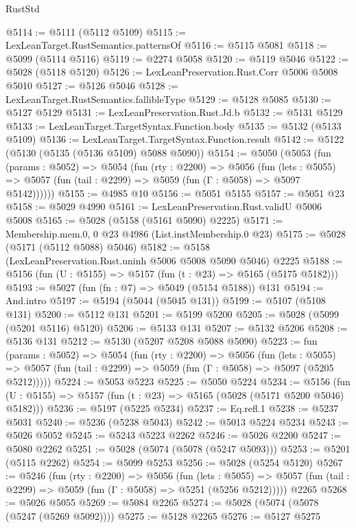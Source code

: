 \begin{lexlean}{RustStd}
\begin{coremodule}
@5114 := @5111 (@5112 @5109)
@5115 := LexLeanTarget.RustSemantics.patternsOf
@5116 := @5115 @5081
@5118 := @5099 (@5114 @5116)
@5119 := @2274 @5058
@5120 := @5119 @5046
@5122 := @5028 (@5118 @5120)
@5126 := LexLeanPreservation.Rust.Corr @5006 @5008 @5010
@5127 := @5126 @5046
@5128 := LexLeanTarget.RustSemantics.fallibleType
@5129 := @5128 @5085
@5130 := @5127 @5129
@5131 := LexLeanPreservation.Rust.Jd.b
@5132 := @5131 @5129
@5133 := LexLeanTarget.TargetSyntax.Function.body
@5135 := @5132 (@5133 @5109)
@5136 := LexLeanTarget.TargetSyntax.Function.result
@5142 := @5122 (@5130 (@5135 (@5136 @5109) @5088 @5090))
@5154 := @5050
    (@5053
      (fun (params : @5052) =>
      @5054
        (fun (rty : @2200) =>
        @5056
          (fun (lets : @5055) =>
          @5057 (fun (tail : @2299) => @5059 (fun (Γ : @5058) => @5097 @5142))))))
@5155 := @4985 @10
@5156 := @5051 @5155
@5157 := @5051 @23
@5158 := @5029 @4990
@5161 := LexLeanPreservation.Rust.validU @5006 @5008
@5165 := @5028 (@5158 (@5161 @5090) @2225)
@5171 := Membership.mem.{0, 0} @23 @4986 (List.instMembership.{0} @23)
@5175 := @5028 (@5171 (@5112 @5088) @5046)
@5182 := @5158 (LexLeanPreservation.Rust.uninh @5006 @5008 @5090 @5046) @2225
@5188 := @5156 (fun (U : @5155) => @5157 (fun (t : @23) => @5165 (@5175 @5182)))
@5193 := @5027 (fun (fn : @7) => @5049 (@5154 @5188)) @131
@5194 := And.intro
@5197 := @5194 (@5044 (@5045 @131))
@5199 := @5107 (@5108 @131)
@5200 := @5112 @131
@5201 := @5199 @5200
@5205 := @5028 (@5099 (@5201 @5116) @5120)
@5206 := @5133 @131
@5207 := @5132 @5206
@5208 := @5136 @131
@5212 := @5130 (@5207 @5208 @5088 @5090)
@5223 := fun (params : @5052) =>
  @5054
    (fun (rty : @2200) =>
    @5056
      (fun (lets : @5055) =>
      @5057 (fun (tail : @2299) => @5059 (fun (Γ : @5058) => @5097 (@5205 @5212)))))
@5224 := @5053 @5223
@5225 := @5050 @5224
@5234 := @5156 (fun (U : @5155) => @5157 (fun (t : @23) => @5165 (@5028 (@5171 @5200 @5046) @5182)))
@5236 := @5197 (@5225 @5234)
@5237 := Eq.refl.{1}
@5238 := @5237 @5031
@5240 := @5236 (@5238 @5043)
@5242 := @5013 @5224 @5234
@5243 := @5026 @5052
@5245 := @5243 @5223 @2262
@5246 := @5026 @2200
@5247 := @5080 @2262
@5251 := @5028 (@5074 (@5078 (@5247 @5093)))
@5253 := @5201 (@5115 @2262)
@5254 := @5099 @5253
@5256 := @5028 (@5254 @5120)
@5267 := @5246
    (fun (rty : @2200) =>
    @5056
      (fun (lets : @5055) =>
      @5057 (fun (tail : @2299) => @5059 (fun (Γ : @5058) => @5251 (@5256 @5212)))))
    @2265
@5268 := @5026 @5055
@5269 := @5084 @2265
@5274 := @5028 (@5074 (@5078 (@5247 (@5269 @5092))))
@5275 := @5128 @2265
@5276 := @5127 @5275

\end{coremodule}
\end{lexlean}
